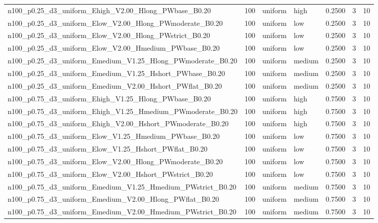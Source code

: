 \begin{tabular}{lrllrrr}
n100_p0.25_d3_uniform_Ehigh_V2.00_Hlong_PWbase_B0.20 & 100 & uniform & high & 0.2500 & 3 & 10 \\
n100_p0.25_d3_uniform_Elow_V2.00_Hlong_PWmoderate_B0.20 & 100 & uniform & low & 0.2500 & 3 & 10 \\
n100_p0.25_d3_uniform_Elow_V2.00_Hlong_PWstrict_B0.20 & 100 & uniform & low & 0.2500 & 3 & 10 \\
n100_p0.25_d3_uniform_Elow_V2.00_Hmedium_PWbase_B0.20 & 100 & uniform & low & 0.2500 & 3 & 10 \\
n100_p0.25_d3_uniform_Emedium_V1.25_Hlong_PWmoderate_B0.20 & 100 & uniform & medium & 0.2500 & 3 & 10 \\
n100_p0.25_d3_uniform_Emedium_V1.25_Hshort_PWbase_B0.20 & 100 & uniform & medium & 0.2500 & 3 & 10 \\
n100_p0.25_d3_uniform_Emedium_V2.00_Hshort_PWflat_B0.20 & 100 & uniform & medium & 0.2500 & 3 & 10 \\
n100_p0.75_d3_uniform_Ehigh_V1.25_Hlong_PWbase_B0.20 & 100 & uniform & high & 0.7500 & 3 & 10 \\
n100_p0.75_d3_uniform_Ehigh_V1.25_Hmedium_PWmoderate_B0.20 & 100 & uniform & high & 0.7500 & 3 & 10 \\
n100_p0.75_d3_uniform_Ehigh_V2.00_Hshort_PWmoderate_B0.20 & 100 & uniform & high & 0.7500 & 3 & 10 \\
n100_p0.75_d3_uniform_Elow_V1.25_Hmedium_PWbase_B0.20 & 100 & uniform & low & 0.7500 & 3 & 10 \\
n100_p0.75_d3_uniform_Elow_V1.25_Hshort_PWflat_B0.20 & 100 & uniform & low & 0.7500 & 3 & 10 \\
n100_p0.75_d3_uniform_Elow_V2.00_Hlong_PWmoderate_B0.20 & 100 & uniform & low & 0.7500 & 3 & 10 \\
n100_p0.75_d3_uniform_Elow_V2.00_Hshort_PWstrict_B0.20 & 100 & uniform & low & 0.7500 & 3 & 10 \\
n100_p0.75_d3_uniform_Emedium_V1.25_Hmedium_PWstrict_B0.20 & 100 & uniform & medium & 0.7500 & 3 & 10 \\
n100_p0.75_d3_uniform_Emedium_V2.00_Hlong_PWflat_B0.20 & 100 & uniform & medium & 0.7500 & 3 & 10 \\
n100_p0.75_d3_uniform_Emedium_V2.00_Hmedium_PWstrict_B0.20 & 100 & uniform & medium & 0.7500 & 3 & 10 \\
\bottomrule
\end{tabular}
